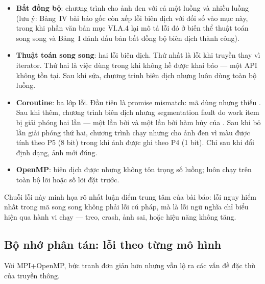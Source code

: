 \begin{itemize}
  \item \textbf{Bất đồng bộ}: chương trình cho ảnh đen với cả một luồng và nhiều
        luồng (lưu ý: Bảng~IV bài báo gốc còn xếp lỗi biên dịch
         với đối số  vào mục này, trong khi phần
        văn bản mục VI.A.4 lại mô tả lỗi đó ở biến thể thuật toán song song và
        Bảng~I đánh dấu bản bất đồng bộ biên dịch thành công).
  \item \textbf{Thuật toán song song}: hai lỗi biên dịch. Thứ nhất là lỗi
         khi truyền  thay vì iterator. Thứ hai
        là việc dùng 
        trong khi  không hề được khai báo — một API
        không tồn tại. Sau khi sửa, chương trình biên dịch nhưng luôn dùng toàn bộ
        luồng.
  \item \textbf{Coroutine}: ba lớp lỗi. Đầu tiên là promise mismatch: mã dùng
         nhưng  thiếu
        . Sau khi thêm, chương trình biên dịch nhưng
        segmentation fault do work item bị giải phóng hai lần — một lần bởi
         và một lần bởi hàm hủy của . Sau khi bỏ
        lần giải phóng thứ hai, chương trình chạy nhưng cho ảnh đen vì màu được
        tính theo P5 (8 bit) trong khi ảnh được ghi theo P4 (1 bit). Chỉ sau khi
        đổi định dạng, ảnh mới đúng.
  \item \textbf{OpenMP}: biên dịch được nhưng không tôn trọng số luồng; luôn chạy
        trên toàn bộ lõi hoặc số lõi đặt trước.
\end{itemize}

Chuỗi lỗi này minh họa rõ nhất luận điểm trung tâm của bài báo: lỗi nguy hiểm
nhất trong mã song song không phải lỗi cú pháp, mà là lỗi ngữ nghĩa chỉ biểu hiện
qua hành vi chạy — treo, crash, ảnh sai, hoặc hiệu năng không tăng.

\subsection{Bộ nhớ phân tán: lỗi theo từng mô hình}

Với MPI+OpenMP, bức tranh đơn giản hơn nhưng vẫn lộ ra các vấn đề đặc thù của
truyền thông.

